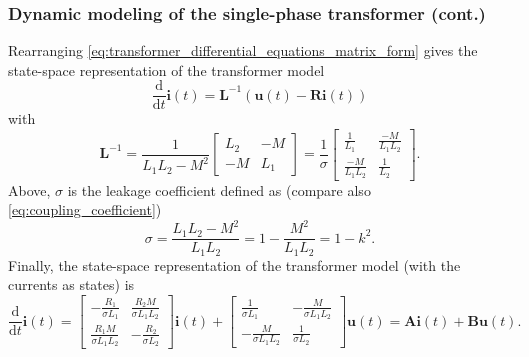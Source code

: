 \begin{frame}
	\frametitle{Dynamic modeling of the single-phase transformer (cont.)}
		Rearranging \eqref{eq:transformer_differential_equations_matrix_form} gives the state-space representation of the transformer model
		\begin{equation}
			\frac{\mathrm{d}}{\mathrm{d}t}\bm{i}(t) = \bm{L}^{-1}\left(\bm{u}(t)-\bm{R}\bm{i}(t) \right)
			\label{eq:transformer_state_space_01}
		\end{equation}
		with
		$$ \renewcommand*{\arraystretch}{1.3} \bm{L}^{-1} = \frac{1}{L_1L_2 - M^2} \begin{bmatrix} L_2 & -M \\ -M & L_1 \end{bmatrix} = \frac{1}{\sigma} \begin{bmatrix} \frac{1}{L_1} &  \frac{-M}{L_1 L_2} \\ \frac{-M}{L_1 L_2} & \frac{1}{L_2} \end{bmatrix}.$$
		\pause
		Above, $\sigma$ is the leakage coefficient defined as (compare also \eqref{eq:coupling_coefficient})
		\begin{equation}
			\sigma = \frac{L_1 L_2 -M^2}{L_1 L_2 } = 1 - \frac{M^2}{ L_1 L_2} = 1 - k^2 .
		\end{equation}
		\pause
		Finally, the state-space representation of the transformer model (with the currents as states) is
		\begin{equation}
			\renewcommand*{\arraystretch}{1.3} 
			\frac{\mathrm{d}}{\mathrm{d}t}\bm{i}(t) = \begin{bmatrix} -\frac{R_1}{\sigma L_1} & \frac{R_2 M}{\sigma L_1 L_2} \\ \frac{R_1 M}{\sigma L_1 L_2} & -\frac{R_2}{\sigma L_2} \end{bmatrix} \bm{i}(t) + \begin{bmatrix} \frac{1}{\sigma L_1} & -\frac{M}{\sigma L_1 L_2} \\ -\frac{M}{\sigma L_1 L_2} & \frac{1}{\sigma L_2} \end{bmatrix} \bm{u}(t) = \bm{A} \bm{i}(t) + \bm{B} \bm{u}(t) .	 
			\label{eq:transformer_state_space_02}
		\end{equation}
\end{frame}

